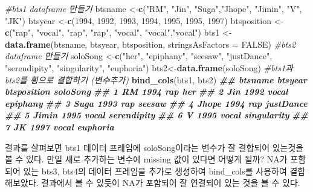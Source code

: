\documentclass[
]{book}
\newenvironment{Shaded}{\begin{snugshade}}{\end{snugshade}}
\newcommand{\AttributeTok}[1]{\textcolor[rgb]{0.13,0.29,0.53}{#1}}
\newcommand{\CommentTok}[1]{\textcolor[rgb]{0.56,0.35,0.01}{\textit{#1}}}
\newcommand{\ConstantTok}[1]{\textcolor[rgb]{0.56,0.35,0.01}{#1}}
\newcommand{\DecValTok}[1]{\textcolor[rgb]{0.00,0.00,0.81}{#1}}
\newcommand{\DocumentationTok}[1]{\textcolor[rgb]{0.56,0.35,0.01}{\textbf{\textit{#1}}}}
\newcommand{\FunctionTok}[1]{\textcolor[rgb]{0.13,0.29,0.53}{\textbf{#1}}}
\newcommand{\NormalTok}[1]{#1}
\newcommand{\OtherTok}[1]{\textcolor[rgb]{0.56,0.35,0.01}{#1}}
\newcommand{\StringTok}[1]{\textcolor[rgb]{0.31,0.60,0.02}{#1}}
\begin{document}
\begin{Shaded}
\begin{Highlighting}[]
\CommentTok{\#bts1 dataframe 만들기}
\NormalTok{btsname }\OtherTok{\textless{}{-}}\FunctionTok{c}\NormalTok{(}\StringTok{"RM"}\NormalTok{, }\StringTok{"Jin"}\NormalTok{, }\StringTok{"Suga"}\NormalTok{,}\StringTok{"Jhope"}\NormalTok{, }\StringTok{"Jimin"}\NormalTok{, }\StringTok{"V"}\NormalTok{, }\StringTok{"JK"}\NormalTok{)}
\NormalTok{btsyear }\OtherTok{\textless{}{-}}\FunctionTok{c}\NormalTok{(}\DecValTok{1994}\NormalTok{, }\DecValTok{1992}\NormalTok{, }\DecValTok{1993}\NormalTok{, }\DecValTok{1994}\NormalTok{, }\DecValTok{1995}\NormalTok{, }\DecValTok{1995}\NormalTok{, }\DecValTok{1997}\NormalTok{)}
\NormalTok{btsposition }\OtherTok{\textless{}{-}}\FunctionTok{c}\NormalTok{(}\StringTok{"rap"}\NormalTok{, }\StringTok{"vocal"}\NormalTok{, }\StringTok{"rap"}\NormalTok{, }\StringTok{"rap"}\NormalTok{, }\StringTok{"vocal"}\NormalTok{, }\StringTok{"vocal"}\NormalTok{,}\StringTok{"vocal"}\NormalTok{)}
\NormalTok{bts1 }\OtherTok{\textless{}{-}}\FunctionTok{data.frame}\NormalTok{(btsname, btsyear, btsposition, }\AttributeTok{stringsAsFactors =} \ConstantTok{FALSE}\NormalTok{)}
\CommentTok{\#bts2 dataframe 만들기}
\NormalTok{soloSong }\OtherTok{\textless{}{-}}\FunctionTok{c}\NormalTok{(}\StringTok{"her"}\NormalTok{, }\StringTok{"epiphany"}\NormalTok{, }\StringTok{"seesaw"}\NormalTok{, }\StringTok{"justDance"}\NormalTok{, }\StringTok{"serendipity"}\NormalTok{, }\StringTok{"singularity"}\NormalTok{, }\StringTok{"euphoria"}\NormalTok{)}
\NormalTok{bts2}\OtherTok{\textless{}{-}}\FunctionTok{data.frame}\NormalTok{(soloSong)}
\CommentTok{\#bts1과 bts2를 횡으로 결합하기 (변수추가)}
\FunctionTok{bind\_cols}\NormalTok{(bts1, bts2)}
\DocumentationTok{\#\#   btsname btsyear btsposition    soloSong}
\DocumentationTok{\#\# 1      RM    1994         rap         her}
\DocumentationTok{\#\# 2     Jin    1992       vocal    epiphany}
\DocumentationTok{\#\# 3    Suga    1993         rap      seesaw}
\DocumentationTok{\#\# 4   Jhope    1994         rap   justDance}
\DocumentationTok{\#\# 5   Jimin    1995       vocal serendipity}
\DocumentationTok{\#\# 6       V    1995       vocal singularity}
\DocumentationTok{\#\# 7      JK    1997       vocal    euphoria}
\end{Highlighting}
\end{Shaded}

결과를 살펴보면 bts1 데이터 프레임에 soloSong이라는 변수가 잘 결합되어 있는것을 볼 수 있다. 만일 새로 추가하는 변수에 missing 값이 있다면 어떻게 될까? NA가 포함되어 있는 bts3, bts4의 데이터 프레임을 추가로 생성하여 bind\_cols를 사용하여 결합해보았다. 결과에서 볼 수 있듯이 NA가 포함되어 잘 연결되어 있는 것을 볼 수 있다.
\end{document}
